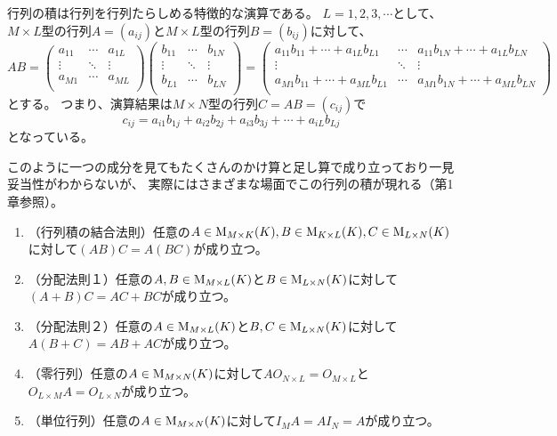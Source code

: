 行列の積は行列を行列たらしめる特徴的な演算である。
$L = 1, 2, 3, \cdots$として、$M\times L$型の行列$A = (a_{i j})$と$M\times L$型の行列$B = (b_{i j})$に対して、
$$
A B =
\begin{pmatrix}
a_{1 1} & \cdots & a_{1 L} \\
\vdots & \ddots & \vdots \\
a_{M 1} & \cdots & a_{M L} \\
\end{pmatrix}
\begin{pmatrix}
b_{1 1} & \cdots & b_{1 N} \\
\vdots & \ddots & \vdots \\
b_{L 1} & \cdots & b_{L N} \\
\end{pmatrix}
=
\begin{pmatrix}
a_{1 1}b_{1 1}+\cdots+a_{1 L}b_{L 1} & \cdots & a_{1 1}b_{1 N}+\cdots+a_{1 L}b_{L N} \\
\vdots & \ddots & \vdots \\
a_{M 1}b_{1 1}+\cdots+a_{M L}b_{L 1} & \cdots & a_{M 1}b_{1 N}+\cdots+a_{M L}b_{L N} \\
\end{pmatrix}
$$
とする。
つまり、演算結果は$M\times N$型の行列$C = A B = (c_{i j})$で
$$
c_{i j} = a_{i 1}b_{1 j}+a_{i 2}b_{2 j}+a_{i 3}b_{3 j}+\cdots+a_{i L}b_{L j}
$$
となっている。

このように一つの成分を見てもたくさんのかけ算と足し算で成り立っており一見妥当性がわからないが、
実際にはさまざまな場面でこの行列の積が現れる（第1章参照）。

\begin{enumerate}
\item
（行列積の結合法則）任意の$A \in \mathrm{M}_{M\times K}(K), B \in \mathrm{M}_{K\times L}(K), C \in \mathrm{M}_{L\times N}(K)$に対して$(A B)C = A(B C)$が成り立つ。
\item
（分配法則１）任意の$A, B \in \mathrm{M}_{M\times L}(K)$と$B \in \mathrm{M}_{L\times N}(K)$に対して$(A+B)C = A C+B C$が成り立つ。
\item
（分配法則２）任意の$A \in \mathrm{M}_{M\times L}(K)$と$B, C \in \mathrm{M}_{L\times N}(K)$に対して$A(B+C) = A B+A C$が成り立つ。
\item
（零行列）任意の$A \in \mathrm{M}_{M\times N}(K)$に対して$A O_{N\times L} = O_{M\times L}$と$O_{L\times M} A = O_{L\times N}$が成り立つ。
\item
（単位行列）任意の$A \in \mathrm{M}_{M\times N}(K)$に対して$I_M A = A I_N = A$が成り立つ。
\end{enumerate}

